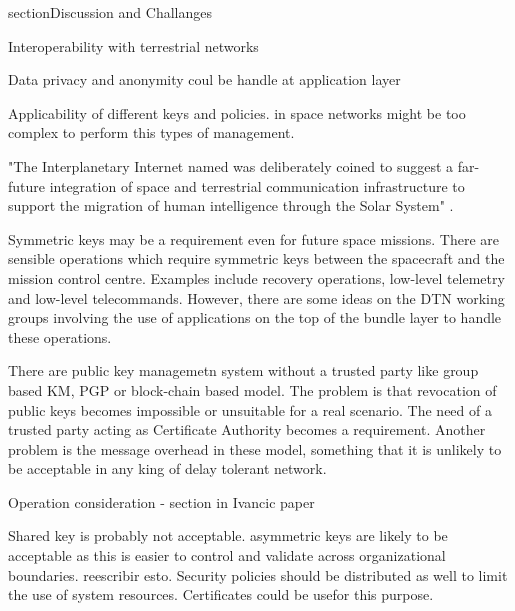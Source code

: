 section{Discussion and Challanges}
\label{sec:discussion}

Interoperability with terrestrial networks



Data privacy and anonymity coul be handle at application layer

Applicability of different keys and policies. in space networks might be too complex to perform this types of management. 

"The Interplanetary Internet named was deliberately coined to suggest a far-future integration of space and terrestrial communication infrastructure to support the migration of human intelligence through the Solar System" \cite{burleigh2003interplanetary}. 


Symmetric keys may be a requirement even for future space missions. There are sensible operations which require symmetric keys between the spacecraft and the mission control centre. Examples include recovery operations, low-level telemetry and low-level telecommands.  However, there are some ideas on the DTN working groups involving the use of applications on the top of the bundle layer to handle these operations. 

There are public key managemetn system without a trusted party like group based KM, PGP or block-chain based model. The problem is that revocation of public keys becomes impossible or unsuitable for a real scenario. The need of a trusted party acting as Certificate Authority becomes a requirement. Another problem is the message overhead in these model, something that it is unlikely to be acceptable in any king of delay tolerant network. 

Operation consideration - section in Ivancic paper

Shared key is probably not acceptable. asymmetric keys are likely to be acceptable as this is easier to control and validate across organizational boundaries. reescribir esto. Security policies should be distributed as well to limit the use of system resources. Certificates could be usefor this purpose. 

